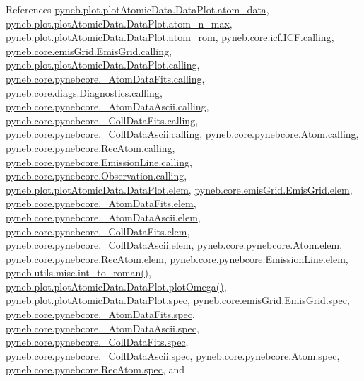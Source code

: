 References \hyperlink{plot_atomic_data_8py_source_l00071}{pyneb.\+plot.\+plot\+Atomic\+Data.\+Data\+Plot.\+atom\+\_\+data}, \hyperlink{plot_atomic_data_8py_source_l00105}{pyneb.\+plot.\+plot\+Atomic\+Data.\+Data\+Plot.\+atom\+\_\+n\+\_\+max}, \hyperlink{plot_atomic_data_8py_source_l00102}{pyneb.\+plot.\+plot\+Atomic\+Data.\+Data\+Plot.\+atom\+\_\+rom}, \hyperlink{icf_8py_source_l00016}{pyneb.\+core.\+icf.\+I\+C\+F.\+calling}, \hyperlink{emis_grid_8py_source_l00041}{pyneb.\+core.\+emis\+Grid.\+Emis\+Grid.\+calling}, \hyperlink{plot_atomic_data_8py_source_l00042}{pyneb.\+plot.\+plot\+Atomic\+Data.\+Data\+Plot.\+calling}, \hyperlink{pynebcore_8py_source_l00090}{pyneb.\+core.\+pynebcore.\+\_\+\+Atom\+Data\+Fits.\+calling}, \hyperlink{diags_8py_source_l00169}{pyneb.\+core.\+diags.\+Diagnostics.\+calling}, \hyperlink{pynebcore_8py_source_l00311}{pyneb.\+core.\+pynebcore.\+\_\+\+Atom\+Data\+Ascii.\+calling}, \hyperlink{pynebcore_8py_source_l00568}{pyneb.\+core.\+pynebcore.\+\_\+\+Coll\+Data\+Fits.\+calling}, \hyperlink{pynebcore_8py_source_l00918}{pyneb.\+core.\+pynebcore.\+\_\+\+Coll\+Data\+Ascii.\+calling}, \hyperlink{pynebcore_8py_source_l01175}{pyneb.\+core.\+pynebcore.\+Atom.\+calling}, \hyperlink{pynebcore_8py_source_l02572}{pyneb.\+core.\+pynebcore.\+Rec\+Atom.\+calling}, \hyperlink{pynebcore_8py_source_l03263}{pyneb.\+core.\+pynebcore.\+Emission\+Line.\+calling}, \hyperlink{pynebcore_8py_source_l03419}{pyneb.\+core.\+pynebcore.\+Observation.\+calling}, \hyperlink{plot_atomic_data_8py_source_l00045}{pyneb.\+plot.\+plot\+Atomic\+Data.\+Data\+Plot.\+elem}, \hyperlink{emis_grid_8py_source_l00045}{pyneb.\+core.\+emis\+Grid.\+Emis\+Grid.\+elem}, \hyperlink{pynebcore_8py_source_l00083}{pyneb.\+core.\+pynebcore.\+\_\+\+Atom\+Data\+Fits.\+elem}, \hyperlink{pynebcore_8py_source_l00304}{pyneb.\+core.\+pynebcore.\+\_\+\+Atom\+Data\+Ascii.\+elem}, \hyperlink{pynebcore_8py_source_l00560}{pyneb.\+core.\+pynebcore.\+\_\+\+Coll\+Data\+Fits.\+elem}, \hyperlink{pynebcore_8py_source_l00910}{pyneb.\+core.\+pynebcore.\+\_\+\+Coll\+Data\+Ascii.\+elem}, \hyperlink{pynebcore_8py_source_l01165}{pyneb.\+core.\+pynebcore.\+Atom.\+elem}, \hyperlink{pynebcore_8py_source_l02565}{pyneb.\+core.\+pynebcore.\+Rec\+Atom.\+elem}, \hyperlink{pynebcore_8py_source_l03267}{pyneb.\+core.\+pynebcore.\+Emission\+Line.\+elem}, \hyperlink{misc_8py_source_l00013}{pyneb.\+utils.\+misc.\+int\+\_\+to\+\_\+roman()}, \hyperlink{plot_atomic_data_8py_source_l00372}{pyneb.\+plot.\+plot\+Atomic\+Data.\+Data\+Plot.\+plot\+Omega()}, \hyperlink{plot_atomic_data_8py_source_l00046}{pyneb.\+plot.\+plot\+Atomic\+Data.\+Data\+Plot.\+spec}, \hyperlink{emis_grid_8py_source_l00046}{pyneb.\+core.\+emis\+Grid.\+Emis\+Grid.\+spec}, \hyperlink{pynebcore_8py_source_l00084}{pyneb.\+core.\+pynebcore.\+\_\+\+Atom\+Data\+Fits.\+spec}, \hyperlink{pynebcore_8py_source_l00305}{pyneb.\+core.\+pynebcore.\+\_\+\+Atom\+Data\+Ascii.\+spec}, \hyperlink{pynebcore_8py_source_l00561}{pyneb.\+core.\+pynebcore.\+\_\+\+Coll\+Data\+Fits.\+spec}, \hyperlink{pynebcore_8py_source_l00911}{pyneb.\+core.\+pynebcore.\+\_\+\+Coll\+Data\+Ascii.\+spec}, \hyperlink{pynebcore_8py_source_l01166}{pyneb.\+core.\+pynebcore.\+Atom.\+spec}, \hyperlink{pynebcore_8py_source_l02566}{pyneb.\+core.\+pynebcore.\+Rec\+Atom.\+spec}, and 